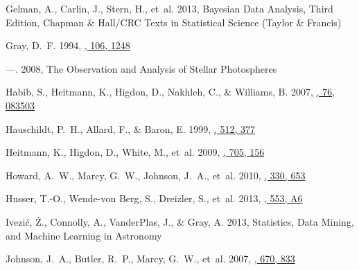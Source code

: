 \documentclass[iop,floatfix,numberedappendix,twocolappendix]{emulateapj}
\begin{document}
\begin{thebibliography}{48}
Gelman, A., Carlin, J., Stern, H., {et~al.} 2013, {Bayesian Data Analysis,
  Third Edition}, {Chapman \& Hall/CRC Texts in Statistical Science} (Taylor \&
  Francis)

{Gray}, D.~F. 1994,
  \href{http://dx.doi.org/10.1086/133502}{\JournalTitle{\pasp}, 106, 1248}

---. 2008, {The Observation and Analysis of Stellar Photospheres}

{Habib}, S., {Heitmann}, K., {Higdon}, D., {Nakhleh}, C., \& {Williams}, B.
  2007,
  \href{http://dx.doi.org/10.1103/PhysRevD.76.083503}{\JournalTitle{\prd}, 76,
  083503}

{Hauschildt}, P.~H., {Allard}, F., \& {Baron}, E. 1999,
  \href{http://dx.doi.org/10.1086/306745}{\JournalTitle{\apj}, 512, 377}

{Heitmann}, K., {Higdon}, D., {White}, M., {et~al.} 2009,
  \href{http://dx.doi.org/10.1088/0004-637X/705/1/156}{\JournalTitle{\apj},
  705, 156}

{Howard}, A.~W., {Marcy}, G.~W., {Johnson}, J.~A., {et~al.} 2010,
  \href{http://dx.doi.org/10.1126/science.1194854}{, 330,
  653}

{Husser}, T.-O., {Wende-von Berg}, S., {Dreizler}, S., {et~al.} 2013,
  \href{http://dx.doi.org/10.1051/0004-6361/201219058}{\JournalTitle{\aap},
  553, A6}

{Ivezi\'{c}}, {\.Z}., {Connolly}, A., {VanderPlas}, J., \& {Gray}, A. 2013,
  {Statistics, Data Mining, and Machine Learning in Astronomy}

{Johnson}, J.~A., {Butler}, R.~P., {Marcy}, G.~W., {et~al.} 2007,
  \href{http://dx.doi.org/10.1086/521720}{\JournalTitle{\apj}, 670, 833}


\end{thebibliography}
\end{document}
